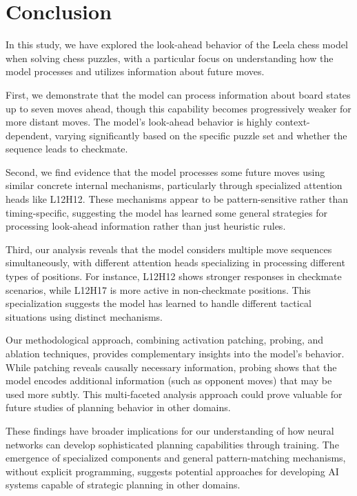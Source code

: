 \documentclass{article}
\begin{document}
\section{Conclusion}

In this study, we have explored the look-ahead behavior of the Leela chess model when solving chess puzzles, with a particular focus on understanding how the model processes and utilizes information about future moves. 

First, we demonstrate that the model can process information about board states up to seven moves ahead, though this capability becomes progressively weaker for more distant moves. The model's look-ahead behavior is highly context-dependent, varying significantly based on the specific puzzle set and whether the sequence leads to checkmate.

Second, we find evidence that the model processes some future moves using similar concrete internal mechanisms, particularly through specialized attention heads like L12H12. These mechanisms appear to be pattern-sensitive rather than timing-specific, suggesting the model has learned some general strategies for processing look-ahead information rather than just heuristic rules.

Third, our analysis reveals that the model considers multiple move sequences simultaneously, with different attention heads specializing in processing different types of positions. For instance, L12H12 shows stronger responses in checkmate scenarios, while L12H17 is more active in non-checkmate positions. This specialization suggests the model has learned to handle different tactical situations using distinct mechanisms.

Our methodological approach, combining activation patching, probing, and ablation techniques, provides complementary insights into the model's behavior. While patching reveals causally necessary information, probing shows that the model encodes additional information (such as opponent moves) that may be used more subtly. This multi-faceted analysis approach could prove valuable for future studies of planning behavior in other domains.

These findings have broader implications for our understanding of how neural networks can develop sophisticated planning capabilities through training. The emergence of specialized components and general pattern-matching mechanisms, without explicit programming, suggests potential approaches for developing AI systems capable of strategic planning in other domains.
\end{document}
